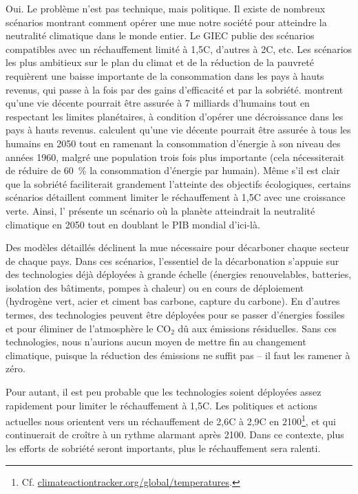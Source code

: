 \documentclass[a5paper,french]{memoir}
\begin{document}
Oui. Le problème n'est pas technique, mais politique. Il existe de nombreux scénarios montrant comment opérer une mue notre société pour atteindre la neutralité climatique dans le monde entier. Le GIEC publie des scénarios compatibles avec un réchauffement limité à 1,5\textdegree{}C, d'autres à 2\textdegree{}C, etc. Les scénarios les plus ambitieux sur le plan du climat et de la réduction de la pauvreté requièrent une baisse importante de la consommation dans les pays à hauts revenus, qui passe à la fois par des gains d'efficacité et par la sobriété. \cite{oneill_good_2018,hickel_is_2019} montrent qu'une vie décente pourrait être assurée à 7 milliards d'humains tout en respectant les limites planétaires, à condition d'opérer une décroissance dans les pays à hauts revenus. \cite{millward-hopkins_providing_2020} calculent qu'une vie décente pourrait être assurée à tous les humains en 2050 tout en ramenant la consommation d'énergie à son niveau des années 1960, malgré une population trois fois plus importante (cela nécessiterait de réduire de 60~\% la consommation d'énergie par humain). Même s'il est clair que la sobriété faciliterait grandement l'atteinte des objectifs écologiques, certains scénarios détaillent comment limiter le réchauffement à 1,5\textdegree{}C avec une croissance verte. Ainsi, l'\cite{iea_net_2023} présente un scénario où la planète atteindrait la neutralité climatique en 2050 tout en doublant le PIB mondial d'ici-là. 

Des modèles détaillés déclinent la mue nécessaire pour décarboner chaque secteur de chaque pays. Dans ces scénarios, l'essentiel de la décarbonation s'appuie sur des technologies déjà déployées à grande échelle (énergies renouvelables, batteries, isolation des bâtiments, pompes à chaleur) ou en cours de déploiement (hydrogène vert, acier et ciment bas carbone, capture du carbone). En d'autres termes, des technologies peuvent être déployées pour se passer d'énergies fossiles et pour éliminer de l'atmosphère le CO$_\text{2}$ dû aux émissions résiduelles. Sans ces technologies, nous n'aurions aucun moyen de mettre fin au changement climatique, puisque la réduction des émissions ne suffit pas -- il faut les ramener à zéro. 

Pour autant, il est peu probable que les technologies soient déployées assez rapidement pour limiter le réchauffement à 1,5\textdegree{}C. Les politiques et actions actuelles nous orientent vers un réchauffement de 2,6\textdegree{}C à 2,9\textdegree{}C en 2100\footnote{Cf. \href{https://climateactiontracker.org/global/temperatures/}{climateactiontracker.org/global/temperatures}.}, et qui continuerait de croître à un rythme alarmant après 2100. Dans ce contexte, plus les efforts de sobriété seront importants, plus le réchauffement sera ralenti. 
\end{document}
